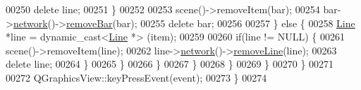 \begin{DoxyCode}
00250                 \textcolor{keyword}{delete} line;
00251               \}
00252 
00253               scene()->removeItem(bar);
00254               bar->\hyperlink{group___models_gab0594d5d7313e8749bb85434b255db9a}{network}()->\hyperlink{group___models_ga997ce4f03d316b9f138f2e64e6ca400c}{removeBar}(bar);
00255               \textcolor{keyword}{delete} bar;
00256 
00257             \} \textcolor{keywordflow}{else} \{
00258               \hyperlink{class_line}{Line} *line = \textcolor{keyword}{dynamic\_cast<}\hyperlink{class_line}{Line} *\textcolor{keyword}{>} (item);
00259 
00260               \textcolor{keywordflow}{if}(line != NULL) \{
00261                 scene()->removeItem(line);
00262                 line->\hyperlink{group___models_gaa4cfa330c9c53ddaf86c8f5c17ba1ee0}{network}()->\hyperlink{group___models_ga1eef3317224a7a06348fce07e581a9ad}{removeLine}(line);
00263                 \textcolor{keyword}{delete} line;
00264               \}
00265             \}
00266           \}
00267         \}
00268       \}
00269     \}
00270   \}
00271 
00272   QGraphicsView::keyPressEvent(event);
00273 \}
00274 
\end{DoxyCode}
